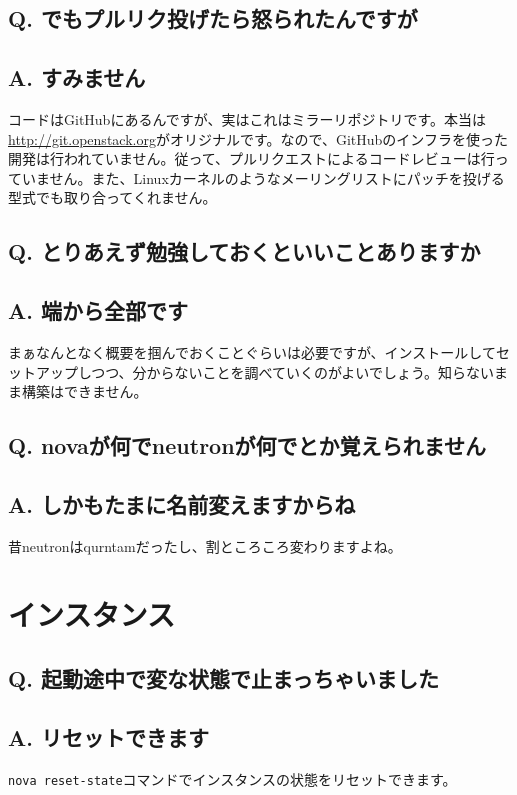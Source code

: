 \documentclass[9pt,b5paper,tombo,openany]{jsbook}
\begin{document}
\subsection*{{\LARGE\bfseries Q.} でもプルリク投げたら怒られたんですが}
\subsection*{{\LARGE\bfseries A.} すみません}
コードはGitHubにあるんですが、実はこれはミラーリポジトリです。本当は\url{http://git.openstack.org}がオリジナルです。なので、GitHubのインフラを使った開発は行われていません。従って、プルリクエストによるコードレビューは行っていません。また、Linuxカーネルのようなメーリングリストにパッチを投げる型式でも取り合ってくれません。

\subsection*{{\LARGE\bfseries Q.} とりあえず勉強しておくといいことありますか}
\subsection*{{\LARGE\bfseries A.} 端から全部です}
まぁなんとなく概要を掴んでおくことぐらいは必要ですが、インストールしてセットアップしつつ、分からないことを調べていくのがよいでしょう。知らないまま構築はできません。

\subsection*{{\LARGE\bfseries Q.} novaが何でneutronが何でとか覚えられません}
\subsection*{{\LARGE\bfseries A.} しかもたまに名前変えますからね}
昔neutronはqurntamだったし、割ところころ変わりますよね。

\section{インスタンス}

\subsection*{{\LARGE\bfseries Q.} 起動途中で変な状態で止まっちゃいました}
\subsection*{{\LARGE\bfseries A.} リセットできます}
\verb|nova reset-state|コマンドでインスタンスの状態をリセットできます。
\end{document}

